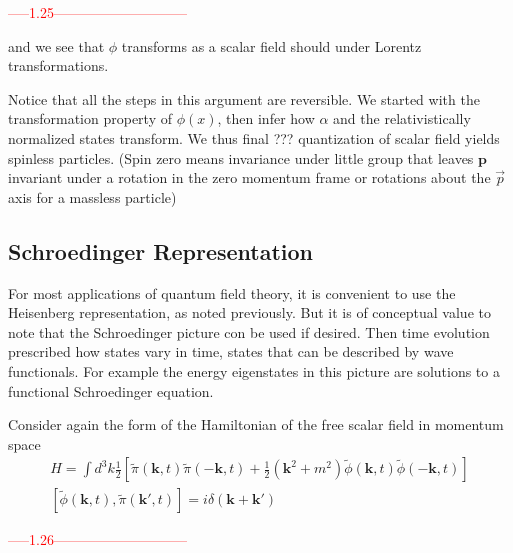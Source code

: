 \documentclass{article}
\begin{document}
\textcolor{red}{-----1.25-----------------------------}
\newline

and we see that $\phi$ transforms as a scalar field should under Lorentz transformations.

Notice that all the steps in this argument are reversible. We started with the transformation property of $\phi(x)$, then infer how $\alpha$ and the relativistically normalized states transform. We thus final ??? quantization of scalar field yields spinless particles. (Spin zero means invariance under little group that leaves $\mathbf{p}$ invariant under a rotation in the zero momentum frame or rotations about the $\vec{p}$ axis for a massless particle)

\subsection{Schroedinger Representation}

For most applications of quantum field theory, it is convenient to use the Heisenberg representation, as noted previously.
But it is of conceptual value to note that the Schroedinger picture con be used if desired. Then time evolution prescribed how states vary in time, states that can be described by wave functionals.
For example the energy eigenstates in this picture are solutions to a functional Schroedinger equation.

Consider again the form of the Hamiltonian of the free scalar field in momentum space
\begin{align}
H=\int d^3k \frac{1}{2}\left[\tilde{\pi}(\mathbf{k}, t) \tilde{\pi}(-\mathbf{k}, t)+\frac{1}{2}\left(\mathbf{k}^{2}+m^{2}\right) \tilde{\phi}(\mathbf{k}, t) \tilde{\phi}(-\mathbf{k}, t)\right] \\
[\tilde{\phi}(\mathbf{k}, t), \tilde{\pi}(\mathbf{k}', t)]=i \delta\left(\mathbf{k}+\mathbf{k}'\right)
\end{align}

\textcolor{red}{-----1.26-----------------------------}
\newline
\end{document}
